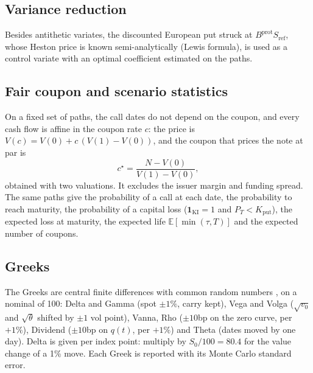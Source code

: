 \documentclass[11pt,a4paper]{article}
\newcommand{\E}{\mathbb{E}}
\newcommand{\ind}{\mathbf{1}}
\newcommand{\Sref}{S_{\mathrm{ref}}}
\begin{document}
\subsection{Variance reduction}
Besides antithetic variates, the discounted European put struck at $B^{\mathrm{prot}}\Sref$, whose Heston price
is known semi-analytically (Lewis formula), is used as a control variate with an optimal coefficient estimated on
the paths.

\subsection{Fair coupon and scenario statistics}
On a fixed set of paths, the call dates do not depend on the coupon, and every cash flow is affine in the coupon
rate $c$: the price is $V(c) = V(0) + c\,(V(1) - V(0))$, and the coupon that prices the note at par is
\begin{equation}
c^\star = \frac{N - V(0)}{V(1) - V(0)},
\end{equation}
obtained with two valuations. It excludes the issuer margin and funding spread. The same paths give the
probability of a call at each date, the probability to reach maturity, the probability of a capital loss
($\ind_{\mathrm{KI}} = 1$ and $P_T < K_{\mathrm{put}}$), the expected loss at maturity, the expected life
$\E[\min(\tau, T)]$ and the expected number of coupons.

\subsection{Greeks}
The Greeks are central finite differences with common random numbers \cite{glasserman2004}, on a nominal of 100:
Delta and Gamma (spot $\pm 1\%$, carry kept), Vega and Volga ($\sqrt{v_0}$ and $\sqrt{\theta}$ shifted by
$\pm 1$ vol point), Vanna, Rho ($\pm 10$bp on the zero curve, per $+1\%$), Dividend ($\pm 10$bp on $q(t)$, per
$+1\%$) and Theta (dates moved by one day). Delta is given per index point: multiply by $S_0/100 = 80.4$ for the
value change of a 1\% move. Each Greek is reported with its Monte Carlo standard error.
\end{document}
